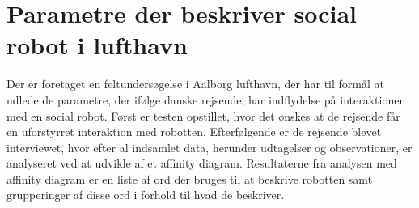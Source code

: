 \chapter*{Parametre der beskriver social robot i lufthavn}
%
Der er foretaget en feltundersøgelse i Aalborg lufthavn, der har til formål at udlede de parametre, der ifølge danske rejsende, har indflydelse på interaktionen med en social robot. Først er testen opstillet, hvor det ønskes at de rejsende får en uforstyrret interaktion med robotten. Efterfølgende er de rejsende blevet interviewet, hvor efter al indsamlet data, herunder udtagelser og observationer, er analyseret ved at udvikle af et affinity diagram. Resultaterne fra analysen med affinity diagram er en liste af ord der bruges til at beskrive robotten samt grupperinger af disse ord i forhold til hvad de beskriver. 
